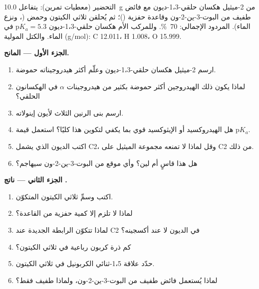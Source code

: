 \begin{problem}
\label{pb:b2:conjugate-additions:1}
التحضير (معطيات تمرين): يتفاعل \qty{10.0}{g} من 2-ميثيل هكسان حلقي-1،3-ديون مع فائض طفيف
من البوت-3-ين-2-ون وقاعدة حفزية ()؛ ثم يُحلقن ثلاثي الكيتون  وحمض (، ونزع الماء). المردود الإجمالي: 70~\%. وللمركب الأم هكسان حلقي-1،3-ديون
$\mathrm pK_a = 5.3$ في الماء. والكتل المولية (\unit{g/mol}): C 12.011، H 1.008، O 15.999.

\medskip
\noindent\textbf{الجزء الأول --- المانح.}
\begin{enumerate}
  \item ارسم 2-ميثيل هكسان حلقي-1،3-ديون وعلّم أكثر هيدروجيناته حموضة.
  \item لماذا يكون ذلك الهيدروجين أكثر حموضة بكثير من هيدروجينات $\alpha$ في الهكسانون الحلقي؟
  \item ارسم بنى الرنين الثلاث لأيون إينولاته.
  \item هل الهيدروكسيد أو الإيثوكسيد قوي بما يكفي لتكوين  هذا كليًا؟ استعمل قيمة $\mathrm pK_a$.
  \item اكتب  الديون الذي يشمل C2، وقل لماذا لا تمنعه مجموعة الميثيل على C2
        من ذلك.
  \item هل  هذا قاسٍ أم لين؟ وأي موقع من البوت-3-ين-2-ون سيهاجم؟
\end{enumerate}

\medskip
\noindent\textbf{الجزء الثاني --- ناتج .}
\begin{enumerate}[resume]
  \item اكتب  وسمِّ ثلاثي الكيتون المتكوّن.
  \item لماذا لا تلزم إلا كمية حفزية من القاعدة؟
  \item لماذا تتكوّن الرابطة الجديدة عند C2 في الديون لا عند أكسجينه؟
  \item كم ذرة كربون رباعية في ثلاثي الكيتون؟
  \item حدّد علاقة 1،5-ثنائي الكربونيل في ثلاثي الكيتون.
  \item لماذا يُستعمل فائض طفيف من البوت-3-ين-2-ون، ولماذا طفيف فقط؟
\end{enumerate}


\end{problem}
